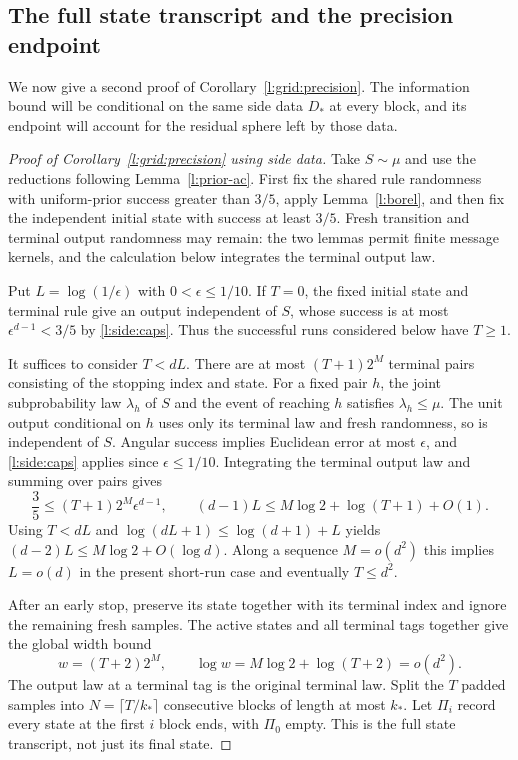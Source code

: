 \subsection{The full state transcript and the precision endpoint}
\label{l:side:endpoint}

We now give a second proof of Corollary~\ref{l:grid:precision}.
The information bound will be conditional on the same side data
$D_*$ at every block, and its endpoint will account for the residual
sphere left by those data.

\begin{proof}[Proof of Corollary~\ref{l:grid:precision} using side data]
Take $S\sim\mu$ and use the reductions following
Lemma~\ref{l:prior-ac}.  First fix the shared rule randomness with
uniform-prior success greater than $3/5$, apply Lemma~\ref{l:borel},
and then fix the independent initial state with success at least
$3/5$.  Fresh transition and terminal output randomness may remain:
the two lemmas permit finite message kernels, and the calculation below
integrates the terminal output law.

Put $L=\log(1/\epsilon)$ with $0<\epsilon\le1/10$.
If $T=0$, the fixed initial state and terminal rule give an output
independent of $S$, whose success is at most $\epsilon^{d-1}<3/5$ by
\eqref{l:side:caps}.  Thus the successful runs considered below have
$T\ge1$.

It suffices to consider $T<dL$.  There are at most $(T+1)2^M$ terminal pairs consisting
of the stopping index and state.  For a fixed pair $h$, the joint
subprobability law $\lambda_h$ of $S$ and the event of reaching $h$
satisfies $\lambda_h\le\mu$.  The unit output conditional on $h$ uses
only its terminal law and fresh randomness, so is independent of $S$.
Angular success implies Euclidean error at most $\epsilon$, and
\eqref{l:side:caps} applies since $\epsilon\le1/10$.  Integrating the
terminal output law and summing over pairs gives
\begin{equation}\label{l:side:output-count}
 \frac35\le(T+1)2^M\epsilon^{d-1},\qquad
 (d-1)L\le M\log2+\log(T+1)+O(1).
\end{equation}
Using $T<dL$ and $\log(dL+1)\le\log(d+1)+L$ yields
$(d-2)L\le M\log2+O(\log d)$.  Along a sequence $M=o(d^2)$ this
implies $L=o(d)$ in the present short-run case and eventually $T\le d^2$.

After an early stop, preserve its state together with its terminal index
and ignore the remaining fresh samples.  The active states and all
terminal tags together give the global width bound
\begin{equation}\label{l:side:padded-width}
 w=(T+2)2^M,\qquad \log w=M\log2+\log(T+2)=o(d^2).
\end{equation}
The output law at a terminal tag is the original terminal law.  Split
the $T$ padded samples into $N=\lceil T/k_*\rceil$ consecutive blocks
of length at most $k_*$.  Let $\Pi_i$ record every state at the first
$i$ block ends, with $\Pi_0$ empty.  This is the full state transcript,
not just its final state.


\end{proof}
